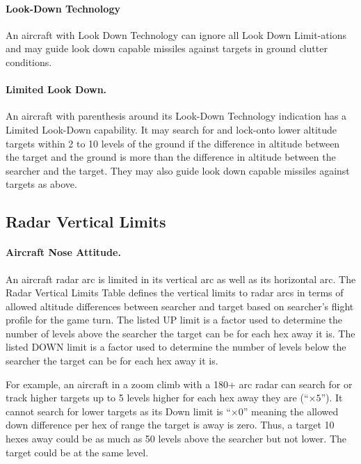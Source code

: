\paragraph{Look-Down Technology} An aircraft with Look Down Technology can ignore all Look Down Limit-ations and may guide look down capable missiles against targets in ground clutter conditions.

\paragraph{Limited Look Down.} An aircraft with parenthesis around its Look-Down Technology indication has a Limited Look-Down capability.  It may search for and lock-onto lower altitude targets within 2 to 10 levels of the ground if the difference in altitude between the target and the ground is more than the difference in altitude between the searcher and the target. They may also guide look down capable missiles against targets as above.

\subsection{Radar Vertical Limits}

\paragraph{Aircraft Nose Attitude.} An aircraft radar arc is limited in its vertical arc as well as its horizontal arc. The Radar Vertical Limits Table defines the vertical limits to radar arcs in terms of allowed altitude differences between searcher and target based on searcher's flight profile for the game turn. The listed UP limit is a factor used to determine the number of levels above the searcher the target can be for each hex away it is. The listed DOWN limit is a factor used to determine the number of levels below the searcher the target can be for each hex away it is. 

For example, an aircraft in a zoom climb with a 180+ arc radar can search for or track higher targets up to 5 levels higher for each hex away they are (“$\times5$”). It cannot search for lower targets as its Down limit is “$\times0$” meaning the allowed down difference per hex of range the target is away is zero. Thus, a target 10 hexes away could be as much as 50 levels above the searcher but not lower. The target could be at the same level.

